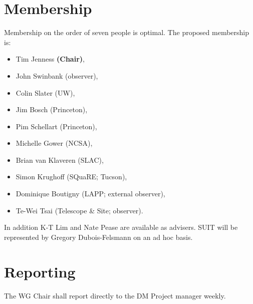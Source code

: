 \section{Membership}

Membership on the order of seven people is optimal.
The proposed membership is:

\begin{itemize}
  \item Tim Jenness \textbf{(Chair)},
  \item John Swinbank (observer),
  \item Colin Slater (UW),
  \item Jim Bosch (Princeton),
  \item Pim Schellart (Princeton),
  \item Michelle Gower (NCSA),
  \item Brian van Klaveren (SLAC),
  \item Simon Krughoff (SQuaRE; Tucson),
  \item Dominique Boutigny (LAPP; external observer),
  \item Te-Wei Tsai (Telescope \& Site; observer).
\end{itemize}

In addition K-T Lim and Nate Pease are available as advisers.
SUIT will be represented by Gregory Dubois-Felsmann on an ad hoc basis.

\section{Reporting}

The WG Chair shall report directly to the DM Project manager weekly.
